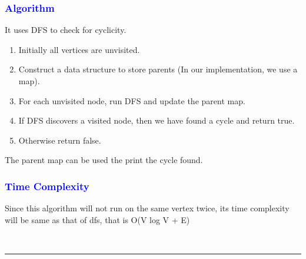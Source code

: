\documentclass[11pt,a4paper]{article}
\begin{document}
\subsubsection*{\textcolor{blue}{ \large {Algorithm}}}
It uses DFS to check for cyclicity.

\begin{enumerate}  
\item Initially all vertices are unvisited.
\item Construct a data structure to store parents (In our implementation, we use a map).
\item For each unvisited node, run DFS and update the parent map.
\item If DFS discovers a visited node, then we have found a cycle and return true.

\item Otherwise return false.
\end{enumerate}  
The parent map can be used the print the cycle found.


\subsubsection*{\textcolor{blue}{ \large {Time Complexity}}}
Since this algorithm will not run on the same vertex twice, its time complexity will be same as that of dfs, that is O(V log V + E)

\\
\rule{17cm}{0.1mm}
\end{document}
